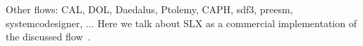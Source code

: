 Other flows: CAL, DOL, Daedalus, Ptolemy, CAPH, sdf3, preesm, systemcodesigner, ...
Here we talk about SLX as a commercial implementation of the discussed flow~\cite{maps}.
